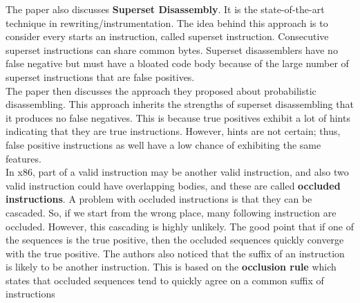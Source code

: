 \documentclass{article}
\begin{document}
\noindent The paper also discusses \textbf{Superset Disassembly}. It is the state-of-the-art technique in rewriting/instrumentation. The idea behind this approach is to consider every starts an instruction, called superset instruction. Consecutive superset instructions can share common bytes. Superset disassemblers have no false negative but must have a bloated code body because of the large number of superset instructions that are false positives.\\

\noindent The paper then discusses the approach they proposed about probabilistic disassembling. This approach inherits the strengths of superset disassembling that it produces no false negatives. This is because true positives exhibit a lot of hints indicating that they are true instructions. However, hints are not certain; thus, false positive instructions as well have a low chance of exhibiting the same features. \\

\noindent In x86, part of a valid instruction may be another valid instruction, and also two valid instruction could have overlapping bodies, and these are called \textbf{occluded instructions}. A problem with occluded instructions is that they can be cascaded. So, if we start from the wrong place, many following instruction are occluded. However, this cascading is highly unlikely. The good point that if one of the sequences is the true positive, then the occluded sequences quickly converge with the true positive. The authors also noticed that the suffix of an instruction is likely to be another instruction. This is based on the \textbf{occlusion rule} which states that occluded sequences tend to quickly agree on a common suffix of instructions\\
\end{document}
